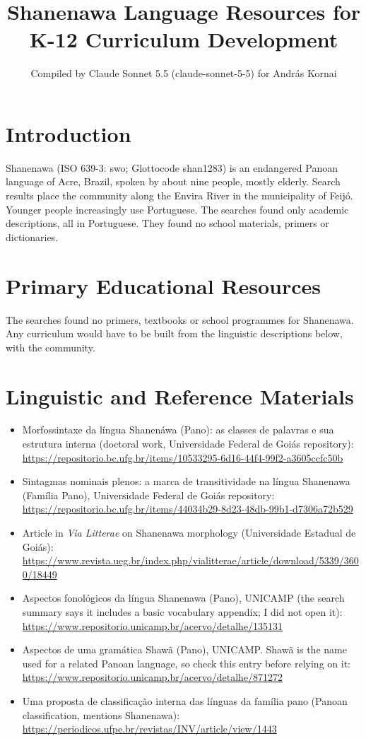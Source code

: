 \documentclass[12pt]{article}
\title{Shanenawa Language Resources for K-12 Curriculum Development}
\author{Compiled by Claude Sonnet 5.5 (claude-sonnet-5-5) for Andr\'as Kornai}
\date{}
\begin{document}
\maketitle

\section{Introduction}
Shanenawa (ISO 639-3: swo; Glottocode shan1283) is an endangered Panoan language of Acre, Brazil, spoken by about nine people, mostly elderly. Search results place the community along the Envira River in the municipality of Feij\'o. Younger people increasingly use Portuguese. The searches found only academic descriptions, all in Portuguese. They found no school materials, primers or dictionaries.

\section{Primary Educational Resources}
The searches found no primers, textbooks or school programmes for Shanenawa. Any curriculum would have to be built from the linguistic descriptions below, with the community.

\section{Linguistic and Reference Materials}
\begin{itemize}
\item Morfossintaxe da l\'ingua Shanen\'awa (Pano): as classes de palavras e sua estrutura interna (doctoral work, Universidade Federal de Goi\'as repository): \url{https://repositorio.bc.ufg.br/items/10533295-6d16-44f4-99f2-a3605ccfc50b}
\item Sintagmas nominais plenos: a marca de transitividade na l\'ingua Shanenawa (Fam\'ilia Pano), Universidade Federal de Goi\'as repository: \url{https://repositorio.bc.ufg.br/items/44034b29-8d23-48db-99b1-d7306a72b529}
\item Article in \emph{Via Litterae} on Shanenawa morphology (Universidade Estadual de Goi\'as): \url{https://www.revista.ueg.br/index.php/vialitterae/article/download/5339/3600/18449}
\item Aspectos fonol\'ogicos da l\'ingua Shanenawa (Pano), UNICAMP (the search summary says it includes a basic vocabulary appendix; I did not open it): \url{https://www.repositorio.unicamp.br/acervo/detalhe/135131}
\item Aspectos de uma gram\'atica Shaw\~a (Pano), UNICAMP. Shaw\~a is the name used for a related Panoan language, so check this entry before relying on it: \url{https://www.repositorio.unicamp.br/acervo/detalhe/871272}
\item Uma proposta de classifica\c{c}\~ao interna das l\'inguas da fam\'ilia pano (Panoan classification, mentions Shanenawa): \url{https://periodicos.ufpe.br/revistas/INV/article/view/1443}
\end{itemize}
\end{document}
